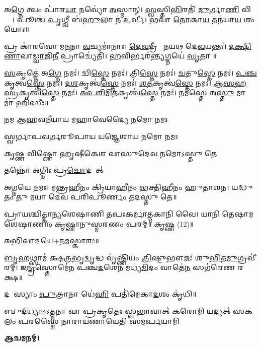 𑌅\ul{𑌗𑍍𑌨𑍇} 𑌤𑍍𑌵𑌂 𑌪𑌾॑𑌰\ul{𑌯𑌾} 𑌨𑌵𑍍𑌯𑍋॑ \ul{𑌅}𑌸𑍍𑌮𑌾𑌨𑍍। \ul{𑌸𑍍𑌵}𑌸𑍍𑌤𑌿\ul{𑌭𑌿}𑌰𑌤𑌿॑ \ul{𑌦𑍁}𑌰𑍍𑌗𑌾\ul{𑌣𑌿} 𑌵𑌿𑌶𑍍𑌵𑌾᳚।
𑌪𑍂𑌶𑍍𑌚॑ \ul{𑌪𑍃}𑌥𑍍𑌵𑍀 𑌬॑\ul{𑌹𑍁}𑌲𑌾 𑌨॑ \ul{𑌉}𑌰𑍍𑌵𑍀। 𑌭𑌵𑌾॑ \ul{𑌤𑍋}𑌕𑌾\ul{𑌯} 𑌤𑌨॑𑌯𑌾\ul{𑌯} 𑌶𑌂 𑌯𑍋𑌃॥

𑌪𑍍𑌰 𑌕𑌾॑𑌰𑌵𑍋 𑌮\ul{𑌨}𑌨𑌾 \ul{𑌵}𑌚𑍍𑌯𑌮𑌾॑𑌨𑌾𑌃। \ul{𑌦𑍇}\ul{𑌵}𑌦𑍍𑌰𑍀𑌚𑍀𑌂᳚ 𑌨𑌯𑌥 𑌦𑍇\ul{𑌵}𑌯𑌨𑍍𑌤𑌃॑।
\ul{𑌦}\ul{𑌕𑍍𑌷𑌿}\ul{𑌣𑌾}𑌵𑌾\ul{𑌡𑍍𑌵𑌾}𑌜𑌿\ul{𑌨𑍀} 𑌪𑍍𑌰𑌾𑌚𑍍𑌯𑍇॑𑌤𑌿। \ul{𑌹}𑌵𑌿𑌰𑍍𑌭𑌰॑\ul{𑌨𑍍𑌤𑍍𑌯}𑌗𑍍𑌨𑌯𑍇॑ \ul{𑌘𑍃}𑌤𑌾𑌚𑍀᳚॥

\ul{𑌸}𑌕𑍃𑌤𑍍𑌤𑍇॑ 𑌅\ul{𑌗𑍍𑌨𑍇} 𑌨𑌮𑌃॑। 𑌦𑍍𑌵𑌿\ul{𑌸𑍍𑌤𑍇} 𑌨𑌮𑌃॑। 𑌤𑍍𑌰𑌿\ul{𑌸𑍍𑌤𑍇} 𑌨𑌮𑌃॑। \ul{𑌚}𑌤𑍁\ul{𑌸𑍍𑌤𑍇} 𑌨𑌮𑌃॑। \ul{𑌪}\ul{𑌞𑍍𑌚}𑌕𑍃𑌤𑍍𑌵॑\ul{𑌸𑍍𑌤𑍇} 𑌨𑌮𑌃॑। \ul{𑌦}\ul{𑌶}𑌕𑍃𑌤𑍍𑌵॑\ul{𑌸𑍍𑌤𑍇} 𑌨𑌮𑌃॑। \ul{𑌶}\ul{𑌤}𑌕𑍃𑌤𑍍𑌵॑\ul{𑌸𑍍𑌤𑍇} 𑌨𑌮𑌃॑। \ul{𑌆}\ul{𑌸}\ul{𑌹}\ul{𑌸𑍍𑌰}𑌕𑍃𑌤𑍍𑌵॑\ul{𑌸𑍍𑌤𑍇} 𑌨𑌮𑌃॑। \ul{𑌅}\ul{𑌪}\ul{𑌰𑌿}\ul{𑌮𑌿}\ul{𑌤}𑌕𑍃𑌤𑍍𑌵॑\ul{𑌸𑍍𑌤𑍇} 𑌨𑌮𑌃॑। 𑌨𑌮॑𑌸𑍍𑌤𑍇 𑌅\ul{𑌸𑍍𑌤𑍁} 𑌮𑌾 𑌮𑌾॑ 𑌹𑌿𑌸𑍀𑌃॥

{𑌨𑌮 𑌆𑌹𑌵𑌨𑍀𑌯𑌾𑌯 𑌮𑌹𑌾𑌵𑍇𑌦𑍍𑌯𑍈 𑌨𑌮𑍋 𑌨𑌮𑌃}

{𑌸𑍍𑌵𑌰𑍍𑌗𑌾𑌪𑌵𑌰𑍍𑌗𑌰𑍂𑌪𑌾𑌯 𑌯𑌜𑍍𑌞𑍇𑌶𑌾𑌯 𑌨𑌮𑍋 𑌨𑌮𑌃}

{𑌕𑍃𑌷𑍍𑌣 𑌵𑌿𑌷𑍍𑌣𑍋 𑌹𑍃𑌷𑍀𑌕𑍇𑌶 𑌵𑌾𑌸𑍁𑌦𑍇𑌵 𑌨𑌮𑍋𑌽𑌸𑍍𑌤𑍁 𑌤𑍇}

{𑌤𑌨𑍍𑌨𑍋॑ 𑌅𑌗𑍍𑌨𑌿𑌃 𑌪𑍍𑌰\ul{𑌚𑍋}𑌦𑌯𑌾᳚𑌤𑍍}

𑌅𑌗𑍍𑌨𑌯𑍇 𑌨𑌮𑌃। 𑌮𑌨𑍍𑌤𑍍𑌰𑌹𑍀𑌨𑌂 𑌕𑍍𑌰𑌿𑌯𑌾𑌹𑍀𑌨𑌂 𑌭𑌕𑍍𑌤𑌿𑌹𑍀𑌨𑌂 𑌹𑍁𑌤𑌾𑌶𑌨।
𑌯𑌦𑍍𑌧𑍁𑌤𑌂 𑌤𑍁 𑌮𑌯𑌾 𑌦𑍇𑌵 𑌪𑌰𑌿𑌪𑍂𑌰𑍍𑌣𑌂 𑌤𑌦𑌸𑍍𑌤𑍁 𑌤𑍇॥

𑌪𑍍𑌰𑌾𑌯𑌶𑍍𑌚𑌿𑌤𑍍𑌤𑌾𑌨𑍍𑌯𑌶𑍇𑌷𑌾𑌣𑌿 𑌤𑌪𑌃𑌕𑌰𑍍𑌮𑌾𑌤𑍍𑌮𑌕𑌾𑌨𑌿 𑌵𑍈।
𑌯𑌾𑌨𑌿 𑌤𑍇𑌷𑌾𑌮𑌶𑍇𑌷𑌾𑌣𑌾𑌂 𑌕𑍃𑌷𑍍𑌣𑌾𑌨𑍁𑌸𑍍𑌮𑌰𑌣𑌂 𑌪𑌰𑌮𑍍॥ 𑌕𑍃𑌷𑍍𑌣 (12)॥

𑌅𑌭𑌿𑌵𑌾𑌦𑌯𑍇+𑌨𑌮𑌸𑍍𑌕𑌾𑌰𑌃॥

\ul{𑌬𑍃}𑌹𑌥𑍍𑌸𑌾𑌮॑ 𑌕𑍍𑌷\ul{𑌤𑍍𑌰}𑌭𑍃\ul{𑌦𑍍𑌵𑍃}𑌦𑍍𑌧 𑌵𑍃॑𑌷𑍍𑌣𑌿𑌯𑌂 \ul{𑌤𑍍𑌰𑌿}𑌷𑍍𑌟𑍁𑌭𑍗𑌜𑌃॑ 𑌶𑍁\ul{𑌭𑌿}𑌤\ul{𑌮𑍁}𑌗𑍍𑌰𑌵𑍀॑𑌰𑌮𑍍।
𑌇\ul{𑌨𑍍𑌦𑍍𑌰}𑌸𑍍𑌤𑍋𑌮𑍇॑𑌨 𑌪𑌞𑍍𑌚\ul{𑌦}𑌶𑍇\ul{𑌨} 𑌮𑌧𑍍𑌯॑\ul{𑌮𑌿}𑌦𑌂 𑌵𑌾𑌤𑍇॑\ul{𑌨} 𑌸𑌗॑𑌰𑍇𑌣 𑌰𑌕𑍍𑌷॥

𑌦𑌶𑌾᳚𑌸𑍍𑌯𑌾𑌂 \ul{𑌪𑍁}𑌤𑍍𑌰𑌾𑌨𑌾 𑌧𑍇॑\ul{𑌹𑌿} 𑌪𑌤𑌿॑𑌮𑍇𑌕𑌾\ul{𑌦}𑌶𑌂 𑌕𑍃॑𑌧𑌿॥

{𑌬𑍁𑌦𑍍‌𑌧𑍍𑌯𑌾𑌽𑌽𑌤𑍍𑌮𑌨𑌾 𑌵𑌾 𑌪𑍍𑌰𑌕𑍃𑌤𑍇𑌃 𑌸𑍍𑌵𑌭𑌾𑌵𑌾𑌤𑍍}
{𑌕𑌰𑍋𑌮𑌿 𑌯𑌦𑍍𑌯𑌤𑍍 𑌸𑌕𑌲𑌂 𑌪𑌰𑌸𑍍𑌮𑍈}
{𑌨𑌾𑌰𑌾𑌯𑌣𑌾𑌯𑍇𑌤𑌿 𑌸𑌮𑌰𑍍𑌪𑌯𑌾𑌮𑌿}

\textbf{𑌆𑌚𑌮𑌨𑌮𑍍।}
